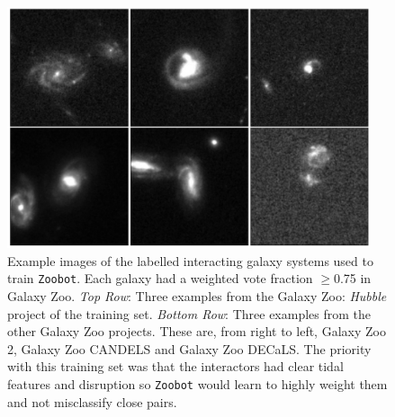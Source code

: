 \begin{figure}
  \centering
  \includegraphics[width=0.95\textwidth]{Chapter2/figures/fig1.jpeg}
  \caption[Example images of the labelled interacting galaxy systems used to train \texttt{Zoobot}.]{Example images of the labelled interacting galaxy systems used to train \texttt{Zoobot}. Each galaxy had a weighted vote fraction $\geq$0.75 in Galaxy Zoo. \textit{Top Row}: Three examples from the Galaxy Zoo: \emph{Hubble} project of the training set. \textit{Bottom Row}: Three examples from the other Galaxy Zoo projects. These are, from right to left, Galaxy Zoo 2, Galaxy Zoo CANDELS and Galaxy Zoo DECaLS. The priority with this training set was that the interactors had clear tidal features and disruption so \texttt{Zoobot} would learn to highly weight them and not misclassify close pairs.}
  \label{fig:training_set_int_ex}
\end{figure}

